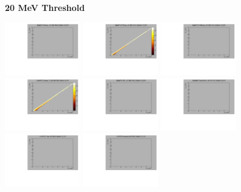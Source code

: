 \textbf{20 MeV Threshold}

\begin{center}

  \includegraphics[width=0.245\textwidth]{plots/response_matrix/Proton_KE_RHC_CC1Pi_20MeV.pdf}
  \includegraphics[width=0.245\textwidth]{plots/response_matrix/PiPlus_KE_RHC_CC1Pi_20MeV.pdf}
  \includegraphics[width=0.245\textwidth]{plots/response_matrix/PiMinus_KE_RHC_CC1Pi_20MeV.pdf}
  \includegraphics[width=0.245\textwidth]{plots/response_matrix/Charged_Pi_KE_RHC_CC1Pi_20MeV.pdf}
  \includegraphics[width=0.245\textwidth]{plots/response_matrix/Pi0_KE_RHC_CC1Pi_20MeV.pdf}
  \includegraphics[width=0.245\textwidth]{plots/response_matrix/Proton+Pion_KE_RHC_CC1Pi_20MeV.pdf}
  \includegraphics[width=0.245\textwidth]{plots/response_matrix/Total_RHC_CC1Pi_20MeV.pdf}
  \includegraphics[width=0.245\textwidth]{plots/response_matrix/Hadrons_RHC_CC1Pi_20MeV.pdf}

\end{center}

